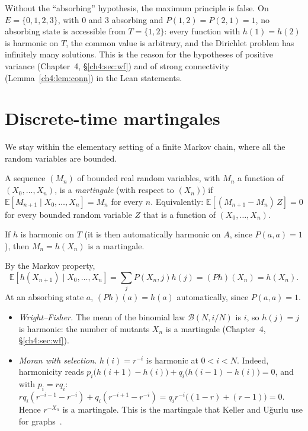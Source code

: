 \begin{remark}
Without the ``absorbing'' hypothesis, the maximum principle is false. On $E=\{0,1,2,3\}$, with $0$ and $3$
absorbing and $P(1,2)=P(2,1)=1$, no absorbing state is accessible from $T=\{1,2\}$: every function with
$h(1)=h(2)$ is harmonic on $T$, the common value is arbitrary, and the Dirichlet problem has infinitely many
solutions. This is the reason for the hypotheses of positive variance (Chapter~4, §\ref{ch4:sec:wf}) and of strong
connectivity (Lemma~\ref{ch4:lem:conn}) in the Lean statements.
\end{remark}

\section{Discrete-time martingales}\label{appB:sec:mart}

We stay within the elementary setting of a finite Markov chain, where all the random variables are bounded.

\begin{definition}
A sequence $(M_n)$ of bounded real random variables, with $M_n$ a function of $(X_0,\dots,X_n)$, is a
\emph{martingale} (with respect to $(X_n)$) if $\mathbb E[M_{n+1}\mid X_0,\dots,X_n]=M_n$ for every $n$.
Equivalently: $\mathbb E[(M_{n+1}-M_n)\,Z]=0$ for every bounded random variable $Z$ that is a function of
$(X_0,\dots,X_n)$.
\end{definition}

\begin{proposition}\label{appB:prop:harmmart}
If $h$ is harmonic on $T$ (it is then automatically harmonic on $A$, since $P(a,a)=1$), then
$M_n=h(X_n)$ is a martingale.
\end{proposition}

\begin{humanproof}
By the Markov property,
\[\mathbb E[h(X_{n+1})\mid X_0,\dots,X_n]=\sum_jP(X_n,j)h(j)=(Ph)(X_n)=h(X_n) .\]
At an
absorbing state $a$, $(Ph)(a)=h(a)$ automatically, since $P(a,a)=1$.
\end{humanproof}

\begin{example}
\begin{itemize}
\item \emph{Wright--Fisher.} The mean of the binomial law $\mathcal B(N,i/N)$ is $i$, so $h(j)=j$ is harmonic:
the number of mutants $X_n$ is a martingale (Chapter~4, §\ref{ch4:sec:wf}).
\item \emph{Moran with selection.} $h(i)=r^{-i}$ is harmonic at $0<i<N$. Indeed, harmonicity reads
$p_i\bigl(h(i+1)-h(i)\bigr)+q_i\bigl(h(i-1)-h(i)\bigr)=0$, and with $p_i=rq_i$:
$rq_i(r^{-i-1}-r^{-i})+q_i(r^{-i+1}-r^{-i})=q_ir^{-i}\bigl((1-r)+(r-1)\bigr)=0$. Hence
$r^{-X_n}$ is a martingale. This is the martingale that Keller and Uğurlu use for graphs~\cite{ch4:KU}.
\end{itemize}
\end{example}

